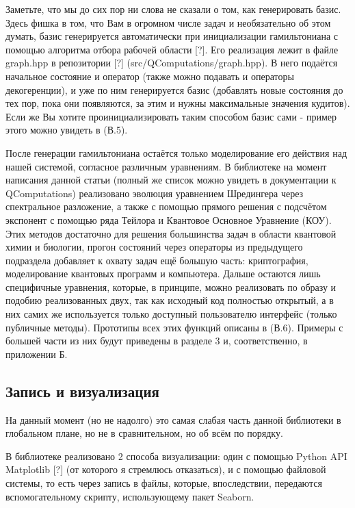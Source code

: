 \documentclass[aps,twocolumn,pra,showpacs,amsmath,amssymb,showkeys,10pt]{revtex4-2}
\begin{document}
    Заметьте, что мы до сих пор ни слова не сказали о том, как генерировать базис. Здесь фишка в том, что Вам в огромном числе задач и необязательно об этом думать, базис генерируется автоматически при 
    инициализации гамильтониана с помощью алгоритма отбора рабочей области [?]. Его реализация лежит в файле graph.hpp в репозитории [?] (src/QComputations/graph.hpp). В него подаётся начальное состояние и 
    оператор (также можно подавать и операторы декогеренции), и уже по ним генерируется базис (добавлять новые состояния до тех пор, пока они появляются, за этим и нужны максимальные значения кудитов). 
    Если же Вы хотите проинициализировать таким способом базис сами - пример этого можно увидеть в (В.5).

    После генерации гамильтониана остаётся только моделирование его действия над нашей системой, согласное различным уравнениям. В библиотеке на момент написания данной статьи (полный же список можно 
    увидеть в документации к QComputations) реализовано эволюция уравнением Шредингера через спектральное разложение, а также с помощью прямого решения с подсчётом экспонент с помощью ряда Тейлора и 
    Квантовое Основное Уравнение (КОУ). Этих методов достаточно для решения большинства задач в области квантовой химии и биологии, прогон состояний через операторы из предыдущего подраздела добавляет 
    к охвату задач ещё большую часть: криптография, моделирование квантовых программ и компьютера. Дальше остаются лишь специфичные уравнения, которые, в принципе, можно реализовать по образу и подобию 
    реализованных двух, так как исходный код полностью открытый, а в них самих же используется только доступный пользователю интерфейс (только публичные методы). Прототипы всех этих функций 
    описаны в (В.6). Примеры с большей части из них будут приведены в разделе 3 и, соответственно, в приложении Б.

    \subsection{Запись и визуализация}
     
    На данный момент (но не надолго) это самая слабая часть данной библиотеки в глобальном плане, но не в сравнительном, но об всём по порядку.

    В библиотеке реализовано 2 способа визуализации: один с помощью Python API Matplotlib [?] (от которого я стремлюсь отказаться), и с помощью файловой системы, то есть через запись в файлы, которые, впоследствии, 
    передаются вспомогательному скрипту, использующему пакет Seaborn.
\end{document}
